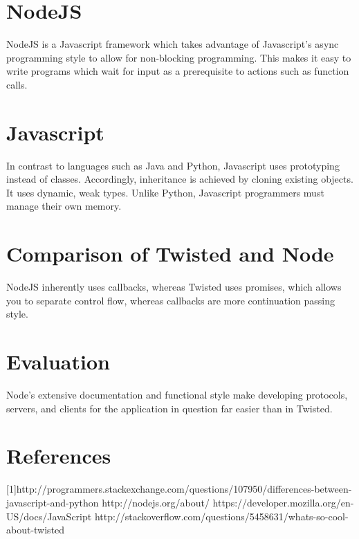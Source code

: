 \documentclass[letterpaper,twocolumn,10pt]{article}
\begin{document}
\section{NodeJS}
NodeJS is a Javascript framework which takes advantage of Javascript's async programming style to allow for non-blocking programming. This makes it easy to write programs which wait for input as a prerequisite to actions such as function calls.

\section{Javascript}
In contrast to languages such as Java and Python, Javascript uses prototyping instead of classes. Accordingly, inheritance is achieved by cloning existing objects. It uses dynamic, weak types. Unlike Python, Javascript programmers must manage their own memory.

\section{Comparison of Twisted and Node}
NodeJS inherently uses callbacks, whereas Twisted uses promises, which allows you to separate control flow, whereas callbacks are more continuation passing style.

\section{Evaluation}
Node's extensive documentation and functional style make developing protocols, servers, and clients for the application in question far easier than in Twisted.
\section{References}
[1]http://programmers.stackexchange.com/questions/107950/differences-between-javascript-and-python \newline
[2]http://nodejs.org/about/ \newline
[3]https://developer.mozilla.org/en-US/docs/JavaScript \newline
[4]http://stackoverflow.com/questions/5458631/whats-so-cool-about-twisted \newline
\end{document}
